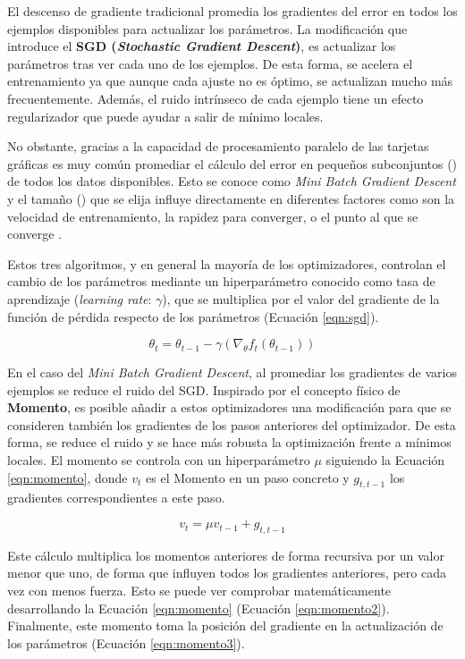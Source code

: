 El descenso de gradiente tradicional promedia los gradientes del error en todos los ejemplos disponibles para actualizar los parámetros. La modificación que introduce el \textbf{SGD (\textit{Stochastic Gradient Descent})}, es actualizar los parámetros tras ver cada uno de los ejemplos. De esta forma, se acelera el entrenamiento ya que aunque cada ajuste no es óptimo, se actualizan mucho más frecuentemente. Además, el ruido intrínseco de cada ejemplo tiene un efecto regularizador que puede ayudar a salir de mínimo locales.

No obstante, gracias a la capacidad de procesamiento paralelo de las tarjetas gráficas es muy común promediar el cálculo del error en pequeños subconjuntos () de todos los datos disponibles. Esto se conoce como \textit{Mini Batch Gradient Descent} y el tamaño () que se elija influye directamente en diferentes factores como son la velocidad de entrenamiento, la rapidez para converger, o el punto al que se converge \cite{on batch size paper}.

Estos tres algoritmos, y en general la mayoría de los optimizadores, controlan el cambio de los parámetros mediante un hiperparámetro conocido como tasa de aprendizaje (\textit{learning rate}: $\gamma$), que se multiplica por el valor del gradiente de la función de pérdida respecto de los parámetros (Ecuación \ref{eqn:sgd}).

\begin{equation}
\label{eqn:sgd}
\theta_t = \theta_{t-1} - \gamma (\nabla_{\theta} f_t(\theta_{t-1}))
\end{equation}

En el caso del \textit{Mini Batch Gradient Descent}, al promediar los gradientes de varios ejemplos se reduce el ruido del SGD. Inspirado por el concepto físico de \textbf{Momento}, es posible añadir a estos optimizadores una modificación para que se consideren también los gradientes de los pasos anteriores del optimizador. De esta forma, se reduce el ruido y se hace más robusta la optimización frente a mínimos locales. El momento se controla con un hiperparámetro $\mu$ siguiendo la Ecuación \ref{eqn:momento}, donde $v_t$ es el Momento en un paso concreto y $g_{t, t-1}$ los gradientes correspondientes a este paso. 

\begin{equation}
\label{eqn:momento}
v_t = \mu v_{t-1} + g_{t, t-1}
\end{equation}

Este cálculo multiplica los momentos anteriores de forma recursiva por un valor menor que uno, de forma que influyen todos los gradientes anteriores, pero cada vez con menos fuerza. Esto se puede ver comprobar matemáticamente desarrollando la Ecuación \ref{eqn:momento} (Ecuación \ref{eqn:momento2}). Finalmente, este momento toma la posición del gradiente en la actualización de los parámetros (Ecuación \ref{eqn:momento3}).

